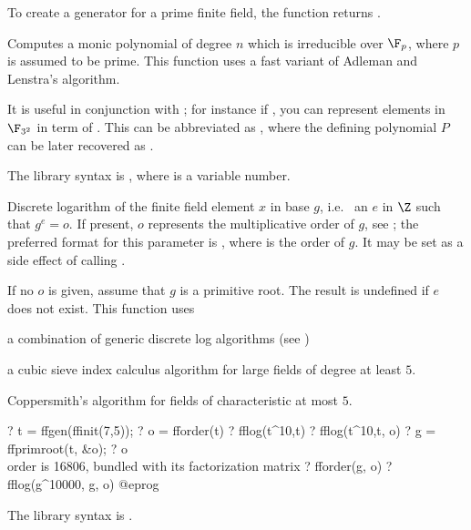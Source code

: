 To create a generator for a prime finite field, the function
 returns .

\label{se:ffinit}
Computes a monic polynomial of degree $n$ which is irreducible over
 $\F_p$, where $p$ is assumed to be prime. This function uses a fast variant
 of Adleman and Lenstra's algorithm.

It is useful in conjunction with ; for instance if
, you can represent elements in $\F_{3^2}$ in term of
. This can be abbreviated as
, where the defining polynomial $P$ can be later
recovered as .

The library syntax is , where  is a variable number.

\label{se:fflog}
Discrete logarithm of the finite field element $x$ in base $g$, i.e.~
an $e$ in $\Z$ such that $g^e = o$. If
present, $o$ represents the multiplicative order of $g$, see
; the preferred format for
this parameter is , where  is the
order of $g$. It may be set as a side effect of calling .

If no $o$ is given, assume that $g$ is a primitive root. The result is
undefined if $e$ does not exist. This function uses

\item a combination of generic discrete log algorithms (see )

\item a cubic sieve index calculus algorithm for large fields of degree at
least $5$.

\item Coppersmith's algorithm for fields of characteristic at most $5$.

\bprog
? t = ffgen(ffinit(7,5));
? o = fforder(t)
? fflog(t^10,t)
? fflog(t^10,t, o)
? g = ffprimroot(t, &o);
? o   \\ order is 16806, bundled with its factorization matrix
? fforder(g, o)
? fflog(g^10000, g, o)
@eprog

The library syntax is .

